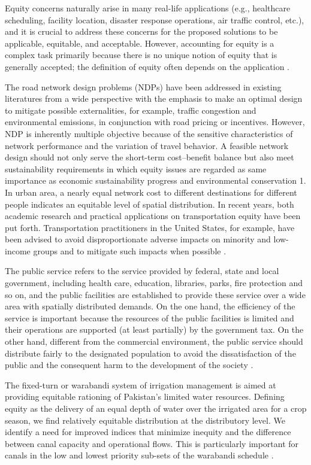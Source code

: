 Equity concerns naturally arise in many real-life applications (e.g., healthcare scheduling, facility location, disaster response operations, air traffic control, etc.), and it is crucial to address these concerns for the proposed solutions to be applicable, equitable, and acceptable. However, accounting for equity is a complex task primarily because there is no unique notion of equity that is generally accepted; the definition of equity often depends on the application \cite{shehadeh2023equity}.

The road network design problems (NDPs) have been addressed in existing literatures from a wide perspective with the emphasis to make an optimal design to mitigate possible externalities, for example, traffic congestion and environmental emissions, in conjunction with road pricing or incentives. However, NDP is inherently multiple objective because of the sensitive characteristics of network performance and the variation of travel behavior. A feasible network design should not only serve the short-term cost–benefit balance but also meet sustainability requirements in which equity issues are regarded as same importance as economic sustainability progress and environmental conservation 1. In urban area, a nearly equal network cost to different destinations for different people indicates an equitable level of spatial distribution. In recent years, both academic research and practical applications on transportation equity have been put forth. Transportation practitioners in the United States, for example, have been advised to avoid disproportionate adverse impacts on minority and low-income groups and to mitigate such impacts when possible \cite{feng2014multicriteria}.

The public service refers to the service provided by federal, state and local government, including health care, education, libraries, parks, fire protection and so on, and the public facilities are established to provide these service over a wide area with spatially distributed demands. On the one hand, the efficiency of the service is important because the resources of the public facilities is limited and their operations are supported (at least partially) by the government tax. On the other hand, different from the commercial environment, the public service should distribute fairly to the designated population to avoid the dissatisfaction of the public and the consequent harm to the development of the society \cite{savas1978equity, zhao2011analyzing}.

The fixed-turn or warabandi system of irrigation management is aimed at providing equitable rationing of Pakistan’s limited water resources. Defining equity as the delivery of an equal depth of water over the irrigated area for a crop season, we find relatively equitable distribution at the distributory level. We identify a need for improved indices that minimize inequity and the difference between canal capacity and operational flows. This is particularly important for canals in the low and lowest priority sub-sets of the warabandi schedule \cite{anwar2013old}.

